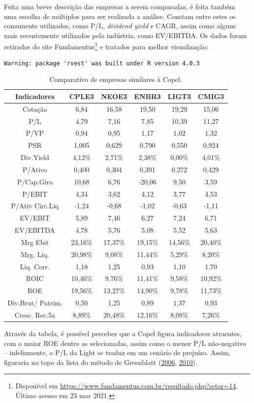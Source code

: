 \documentclass[grad,numbers]{coppe}
\begin{document}
  Feita uma breve descrição das empresas a serem comparadas, é feita também uma escolha de múltiplos para ser realizada a análise. Constam entre estes os comumente utilizados, como P/L, \emph{dividend yield} e CAGR, assim como alguns mais recentemente utilizados pela indústria, como EV/EBITDA. Os dados foram retirados do site Fundamentus\footnote{Disponível em \url{https://www.fundamentus.com.br/resultado.php?setor=14}. Último acesso em 23 mar 2021.} e tratados para melhor visualização:
\begin{verbatim}
Warning: package 'rvest' was built under R version 4.0.3
\end{verbatim}
  \begin{table}[H]

  \caption{\label{tab:unnamed-chunk-20}Comparativo de empresas similares à Copel.}
  \centering
  \begin{tabular}[t]{cccccc}
  \toprule
  Indicadores & CPLE3 & NEOE3 & ENBR3 & LIGT3 & CMIG3\\
  \midrule
  Cotação & 6,84 & 16,58 & 19,50 & 19,29 & 15,06\\
  P/L & 4,79 & 7,16 & 7,85 & 10,39 & 11,27\\
  P/VP & 0,94 & 0,95 & 1,17 & 1,02 & 1,32\\
  PSR & 1,005 & 0,629 & 0,790 & 0,550 & 0,924\\
  Div.Yield & 4,12\% & 2,71\% & 2,38\% & 0,00\% & 4,01\%\\
  \addlinespace
  P/Ativo & 0,400 & 0,304 & 0,391 & 0,272 & 0,429\\
  P/Cap.Giro & 10,68 & 6,76 & -20,06 & 9,50 & 3,59\\
  P/EBIT & 4,34 & 3,62 & 4,12 & 3,77 & 4,53\\
  P/Ativ Circ.Liq & -1,24 & -0,68 & -1,02 & -0,63 & -1,11\\
  EV/EBIT & 5,89 & 7,46 & 6,27 & 7,24 & 6,71\\
  \addlinespace
  EV/EBITDA & 4,78 & 5,76 & 5,08 & 5,52 & 5,63\\
  Mrg Ebit & 23,16\% & 17,37\% & 19,15\% & 14,56\% & 20,40\%\\
  Mrg. Líq. & 20,98\% & 9,08\% & 11,44\% & 5,29\% & 8,20\%\\
  Liq. Corr. & 1,18 & 1,25 & 0,93 & 1,10 & 1,70\\
  ROIC & 10,46\% & 9,76\% & 11,41\% & 9,58\% & 10,92\%\\
  \addlinespace
  ROE & 19,56\% & 13,27\% & 14,90\% & 9,78\% & 11,73\%\\
  Dív.Brut/ Patrim. & 0,50 & 1,25 & 0,89 & 1,37 & 0,93\\
  Cresc. Rec.5a & 8,89\% & 20,48\% & 12,16\% & 8,08\% & 7,26\%\\
  \bottomrule
  \end{tabular}
  \end{table}
  Através da tabela, é possível perceber que a Copel figura indicadores atraentes, com o maior ROE dentre as selecionadas, assim como o menor P/L não-negativo -- infelizmente, o P/L da Light se traduz em um cenário de prejuízo. Assim, figuraria no topo da lista do método de Greenblatt (\protect\hyperlink{ref-greenblatt2006}{2006}, \protect\hyperlink{ref-greenblatt2010}{2010}).
\end{document}
